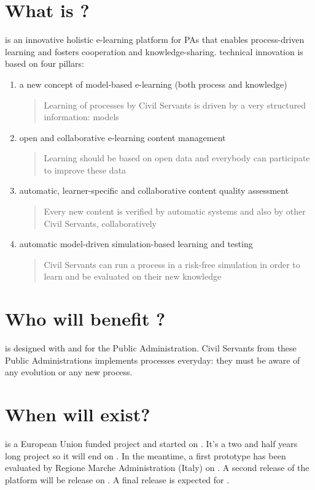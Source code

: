 \documentclass{learnpad}
\begin{document}
\section{What is \learnpad?}
\learnpad is an innovative holistic e-learning platform for PAs that enables
process-driven learning and fosters cooperation and knowledge-sharing.
\learnpad technical innovation is based on four pillars:
\begin{enumerate}
	\item a new concept of model-based e-learning (both process and knowledge)
		\begin{quote}
			Learning of processes by Civil Servants is driven by a very
			structured information: models
		\end{quote}
	\item open and collaborative e-learning content management
		\begin{quote}
			Learning should be based on open data and everybody can participate
			to improve these data
		\end{quote}
	\item automatic, learner-specific and collaborative content quality assessment
		\begin{quote}
			Every new content is verified by automatic systems and also by other
			Civil Servants, collaboratively
		\end{quote}
	\item automatic model-driven simulation-based learning and testing
		\begin{quote}
			Civil Servants can run a process in a risk-free simulation in order
			to learn and be evaluated on their new knowledge
		\end{quote}
\end{enumerate}

\section{Who will benefit \learnpad?}
\learnpad is designed with and for the Public Administration.  Civil Servants
from these Public Administrations implements processes everyday: they must be
aware of any evolution or any new process.

\section{When will \learnpad exist?}
\learnpad is a European Union funded project and started on
.  It's a two and half years long project so it will end
on .  In the meantime, a first prototype has been
evaluated by Regione Marche Administration (Italy) on .  A
second release of the platform will be release on .  A
final release is expected for .
\end{document}
